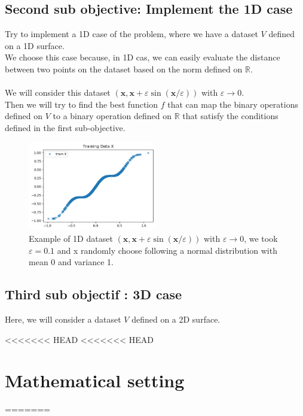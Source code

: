 \documentclass{report}
\begin{document}
        \subsection*{Second sub objective: Implement the 1D case}
            Try to implement a 1D case of the problem, where we have a dataset $V$ defined on a 1D surface.
            \\ 
            We choose this case because, in 1D cas, we can easily evaluate the distance between two points on the dataset based on the norm defined on $\mathbb{R}$.
            \\
            \\
            We will consider this dataset 
            $(\mathbf{x}, \mathbf{x}+\varepsilon \sin (\mathbf{x} / \varepsilon))$ with $\varepsilon \rightarrow 0$.
            \\
            Then we will try to find the best function $f$ that can map the binary operations defined on $V$ to a binary operation defined on $\mathbb{R}$ that satisfy the conditions defined in the first sub-objective.
            \newpage
            \begin{figure}
                \centering
                \includegraphics[width=0.5\textwidth]{./images/M.png}
                \caption{Example of 1D dataset  $(\mathbf{x}, \mathbf{x}+\varepsilon \sin (\mathbf{x} / \varepsilon))$ with $\varepsilon \rightarrow 0$, we took $\varepsilon = 0.1$ and x randomly choose following a normal distribution with mean 0 and variance 1.} 
            \end{figure}

        \subsection*{Third sub objectif : 3D case}
            Here, we will consider a dataset $V$ defined on a 2D surface.

        
<<<<<<< HEAD
<<<<<<< HEAD
\section{Mathematical setting}
=======
\end{document}

